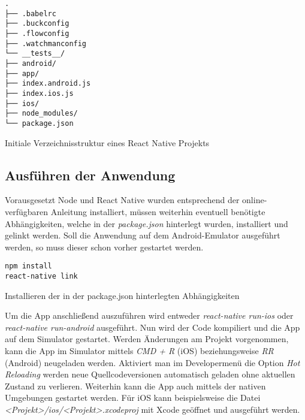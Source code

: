         
\begin{lstlisting}[style=tree]
.
├── .babelrc
├── .buckconfig
├── .flowconfig
├── .watchmanconfig
└── __tests__/
├── android/
├── app/
├── index.android.js
├── index.ios.js
├── ios/
├── node_modules/
└── package.json
    \end{lstlisting}
\vspace{-0.5 cm}
\begin{listing}[H]
    \caption{Initiale Verzeichnisstruktur eines React Native Projekts}
    \label{lst:idirectory_structure}
\end{listing}




\subsection{Ausführen der Anwendung}
Vorausgesetzt Node und React Native wurden entsprechend der online-verfügbaren Anleitung installiert, müssen weiterhin eventuell benötigte Abhängigkeiten, welche in der \textit{package.json} hinterlegt wurden, installiert und gelinkt werden. Soll die Anwendung auf dem Android-Emulator ausgeführt werden, so muss dieser schon vorher gestartet werden.
\begin{listing}[H]
    \begin{verbatim}
npm install
react-native link
    \end{verbatim}
    \caption{Installieren der in der package.json hinterlegten Abhängigkeiten}
    \label{lst:install_dependencies}
\end{listing}

Um die App anschließend auszuführen wird entweder \textit{react-native run-ios} oder \textit{react-native run-android} ausgeführt. Nun wird der Code kompiliert und die App auf dem Simulator gestartet. Werden Änderungen am Projekt vorgenommen, kann die App im Simulator mittels \textit{CMD + R} (iOS) beziehungsweise \textit{RR} (Android) neugeladen werden. Aktiviert man im Developermenü die Option \textit{Hot Reloading} werden neue Quellcodeversionen automatisch geladen ohne aktuellen Zustand zu verlieren. Weiterhin kann die App auch mittels der nativen Umgebungen gestartet werden. Für iOS kann beispielsweise die Datei \textit{<Projekt>/ios/<Projekt>.xcodeproj} mit Xcode geöffnet und ausgeführt werden.

